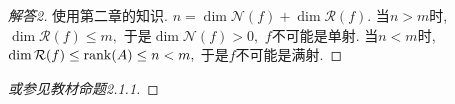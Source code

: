 \documentclass[UTF8]{ctexart}
\begin{document}
\begin{proof}[解答2]
使用第二章的知识. $n = \dim \mathcal{N}(f) + \dim \mathcal{R}(f).$ 当$n>m$时, $\dim \mathcal{R}(f) \leq m,$ 于是$\dim \mathcal{N}(f)>0,$ $f$不可能是单射. 当$n < m$时, $\dim \mathcal{R}(f) \leq {\rm rank}(A) \leq n <m,$ 于是$f$不可能是满射.
\end{proof}

\begin{proof}[或参见教材命题2.1.1]

\end{proof}

\clearpage
\listofchanges
\end{document}
